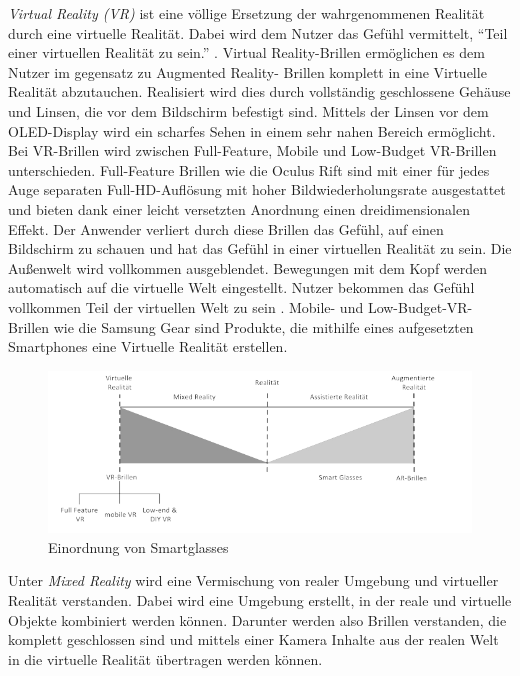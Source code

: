 \emph{Virtual Reality (VR)} ist eine völlige Ersetzung der wahrgenommenen Realität durch eine virtuelle Realität. Dabei wird dem Nutzer das Gefühl vermittelt, \enquote{Teil einer virtuellen Realität zu sein.} \cite[S.~22]{ThomasDirkMetzgerHelmutNiegemannHrsg2018}. Virtual Reality-Brillen ermöglichen es dem Nutzer im gegensatz zu Augmented Reality- Brillen komplett in eine Virtuelle Realität abzutauchen. Realisiert wird dies durch vollständig geschlossene Gehäuse und Linsen, die vor dem Bildschirm befestigt sind. Mittels der Linsen vor dem OLED-Display wird ein scharfes Sehen in einem sehr nahen Bereich ermöglicht. Bei VR-Brillen wird zwischen Full-Feature, Mobile und Low-Budget VR-Brillen unterschieden. Full-Feature Brillen wie die Oculus Rift sind mit einer für jedes Auge separaten Full-HD-Auflösung mit hoher Bildwiederholungsrate ausgestattet und bieten dank einer leicht versetzten Anordnung einen dreidimensionalen Effekt. Der Anwender verliert durch diese Brillen das Gefühl, auf einen Bildschirm zu schauen und hat das Gefühl in einer virtuellen Realität zu sein. Die Außenwelt wird vollkommen ausgeblendet. Bewegungen mit dem Kopf werden automatisch auf die virtuelle Welt eingestellt. Nutzer bekommen das Gefühl vollkommen Teil der virtuellen Welt zu sein \cite[S.~22ff]{ThomasDirkMetzgerHelmutNiegemannHrsg2018}. Mobile- und Low-Budget-VR-Brillen wie die Samsung Gear sind Produkte, die mithilfe eines aufgesetzten Smartphones eine Virtuelle Realität erstellen.
\begin{figure}[htbp]
    \centering
    \includegraphics[width=1\textwidth]{data/bilder/VRvsAR.pdf}
    \caption{Einordnung von Smartglasses \cite{ThomasDirkMetzgerHelmutNiegemannHrsg2018}}
    \label{fig:Einordnung_Von_Smartglasses}
\end{figure}
Unter \emph{Mixed Reality} wird eine Vermischung von realer Umgebung und virtueller Realität verstanden. Dabei wird eine Umgebung erstellt, in der reale und virtuelle Objekte kombiniert werden können. Darunter werden also Brillen verstanden, die komplett geschlossen sind und mittels einer Kamera Inhalte aus der realen Welt in die virtuelle Realität übertragen werden können.

